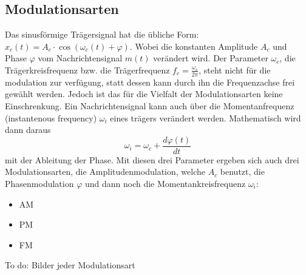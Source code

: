 %
%
%
\subsection{Modulationsarten\label{fm:section:modulation}}

Das sinusförmige Trägersignal hat die übliche Form: 
\(x_c(t) = A_c \cdot \cos(\omega_c(t)+\varphi)\).
Wobei die konstanten Amplitude \(A_c\) und Phase \(\varphi\) vom Nachrichtensignal \(m(t)\) verändert wird.
Der Parameter \(\omega_c\), die Trägerkreisfrequenz bzw. die Trägerfrequenz \(f_c = \frac{\omega_c}{2\pi}\),
steht nicht für die modulation zur verfügung, statt dessen kann durch ihn die Frequenzachse frei gewählt werden.
\newblockpunct
Jedoch ist das für die Vielfalt der Modulationsarten keine Einschrenkung.
Ein Nachrichtensignal kann auch über die Momentanfrequenz (instantenous frequency) \(\omega_i\) eines trägers verändert werden.
Mathematisch wird dann daraus
\[
    \omega_i = \omega_c + \frac{d \varphi(t)}{dt}
\]
mit der Ableitung der Phase\cite{fm:NAT}.
Mit diesen drei Parameter ergeben sich auch drei Modulationsarten, die Amplitudenmodulation, welche \(A_c\) benutzt, 
die Phasenmodulation \(\varphi\) und dann noch die Momentankreisfrequenz \(\omega_i\): 
\begin{itemize}
    \item AM
    \item PM
    \item FM
\end{itemize}

To do: Bilder jeder Modulationsart



